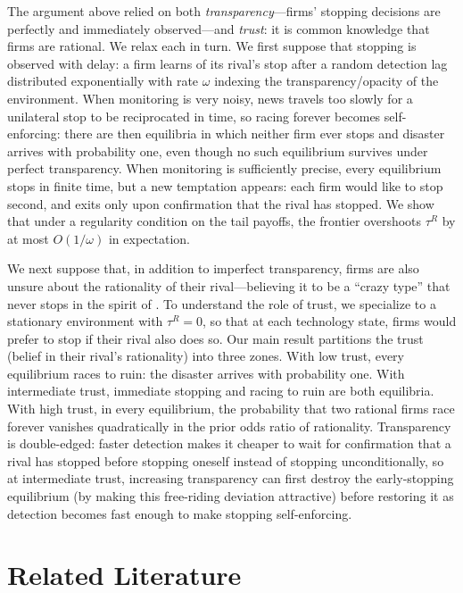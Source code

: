 \documentclass[12pt,reqno]{article}
\theoremstyle{definition} \newtheorem{example}{Example}
\theoremstyle{definition} \newtheorem{condition}{Condition}
\theoremstyle{definition} \newtheorem{corollary}{Corollary}
\theoremstyle{definition} \newtheorem{claim}{Claim}
\theoremstyle{definition} \newtheorem{definition}{Definition}
\theoremstyle{definition} \newtheorem{conjecture}{Conjecture}
\theoremstyle{definition} \newtheorem{Lemma}{Lemma}
\theoremstyle{definition} \newtheorem{lemma}{Lemma}
\theoremstyle{plain} \newtheorem{theorem}{Theorem}
\theoremstyle{definition} \newtheorem{assumption}{Assumption}
\theoremstyle{definition} \newtheorem*{assumptionnonumber}{Assumption}
\theoremstyle{definition} \newtheorem*{theoremNoNumber}{Proposition}
\theoremstyle{definition}
\theoremstyle{definition}\newtheorem{proposition}{Proposition}
\theoremstyle{definition} \newtheorem{result}{Result}
\theoremstyle{definition} \newtheorem*{definitionNoNumber}{Definition}
\theoremstyle{definition} \newtheorem{Definition}{Definition}
\theoremstyle{definition} \newtheorem*{DefinitionNoNumber}{Definition}
\theoremstyle{definition} \newtheorem*{fact}{Fact}
\theoremstyle{definition} \newtheorem*{property}{Property}
\theoremstyle{definition} \newtheorem{remark}{Remark}
\begin{document}
The argument above relied on both \emph{transparency}---firms' stopping decisions are perfectly and immediately observed---and \emph{trust}: it is common knowledge that firms are rational. We relax each in turn. We first suppose that stopping is observed with delay: a firm learns of its rival's stop after a random detection lag distributed exponentially with rate $\omega$ indexing the transparency/opacity of the environment. When monitoring is very noisy, news travels too slowly for a unilateral stop to be reciprocated in time, so racing forever becomes self-enforcing: there are then equilibria in which neither firm ever stops and disaster arrives with probability one, even though no such equilibrium survives under perfect transparency. When monitoring is sufficiently precise, every equilibrium stops in finite time, but a new temptation appears: each firm would like to stop second, and exits only upon confirmation that the rival has stopped. We show that under a regularity condition on the tail payoffs, the frontier overshoots $\tau^R$ by at most $O(1/\omega)$ in expectation. 

We next suppose that, in addition to imperfect transparency, firms are also unsure about the rationality of their rival---believing it to be a ``crazy type'' that never stops in the spirit of \citet{kreps1982reputation}. To understand the role of trust, we specialize to a stationary environment with $\tau^R = 0$, so that at each technology state, firms would prefer to stop if their rival also does so. 
Our main result partitions the trust (belief in their rival's rationality) into three zones. With low trust, every equilibrium races to ruin: the disaster arrives with probability one. With intermediate trust,  immediate stopping and racing to ruin are both equilibria. With high trust, in every equilibrium, the probability that two rational firms race forever vanishes quadratically in the prior odds ratio of rationality. Transparency is double-edged: faster detection makes it cheaper to wait for confirmation that a rival has stopped before stopping oneself instead of stopping unconditionally, so at intermediate trust, increasing transparency can first destroy the early-stopping  equilibrium (by making this free-riding deviation attractive) before restoring it as detection becomes fast enough to make stopping self-enforcing.



%

\section{Related Literature}
\end{document}

